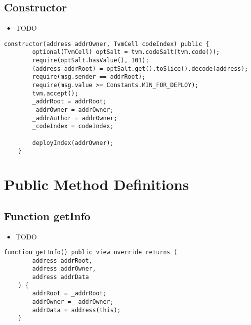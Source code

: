 \subsection{Constructor}

\begin{itemize}
\item TODO
\end{itemize}

\begin{lstlisting}[firstnumber=20]
    constructor(address addrOwner, TvmCell codeIndex) public {
        optional(TvmCell) optSalt = tvm.codeSalt(tvm.code());
        require(optSalt.hasValue(), 101);
        (address addrRoot) = optSalt.get().toSlice().decode(address);
        require(msg.sender == addrRoot);
        require(msg.value >= Constants.MIN_FOR_DEPLOY);
        tvm.accept();
        _addrRoot = addrRoot;
        _addrOwner = addrOwner;
        _addrAuthor = addrOwner;
        _codeIndex = codeIndex;

        deployIndex(addrOwner);
    }
\end{lstlisting}

\section{Public Method Definitions}


\subsection{Function getInfo}

\begin{itemize}
\item TODO
\end{itemize}

\begin{lstlisting}[firstnumber=59]
    function getInfo() public view override returns (
        address addrRoot,
        address addrOwner,
        address addrData
    ) {
        addrRoot = _addrRoot;
        addrOwner = _addrOwner;
        addrData = address(this);
    }
\end{lstlisting}


